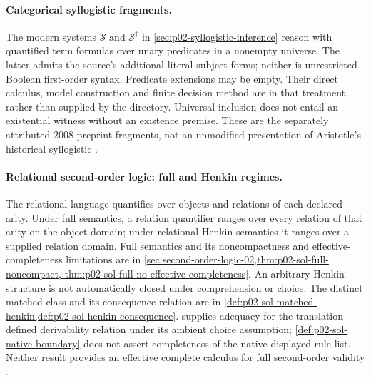 \paragraph{Categorical syllogistic fragments.}
\label{entry:p14-directory-syllogistic}
The modern systems \(\mathcal S\) and \(\mathcal S^\dagger\) in
\cref{sec:p02-syllogistic-inference} reason with quantified term formulas
over unary predicates in a nonempty universe. The latter admits the source's
additional literal-subject forms; neither is unrestricted Boolean
first-order syntax. Predicate extensions may be empty. Their direct
calculus, model construction and finite decision method are in that
treatment, rather than supplied by the directory. Universal inclusion
does not entail an existential witness without an existence premise.
These are the separately attributed 2008 preprint fragments, not an
unmodified presentation of Aristotle's historical syllogistic
\cite{PrattHartmannMoss2008SyllogisticV1}.

\paragraph{Relational second-order logic: full and Henkin regimes.}
\label{entry:p14-directory-sol}
The relational language quantifies over objects and relations of each
declared arity. Under full semantics, a relation quantifier ranges over
every relation of that arity on the object domain; under relational Henkin
semantics it ranges over a supplied relation domain. Full semantics and
its noncompactness and effective-completeness limitations are in
\cref{sec:second-order-logic-02,thm:p02-sol-full-noncompact,
thm:p02-sol-full-no-effective-completeness}. An arbitrary Henkin
structure is not automatically closed under comprehension or choice.
The distinct matched class and its consequence relation are in
\cref{def:p02-sol-matched-henkin,def:p02-sol-henkin-consequence}.
 supplies adequacy for the
translation-defined derivability relation under its ambient choice
assumption; \cref{def:p02-sol-native-boundary} does not assert completeness
of the native displayed rule list. Neither result provides an effective
complete calculus for full second-order validity \cite{Henkin1950,Manzano1996}.

